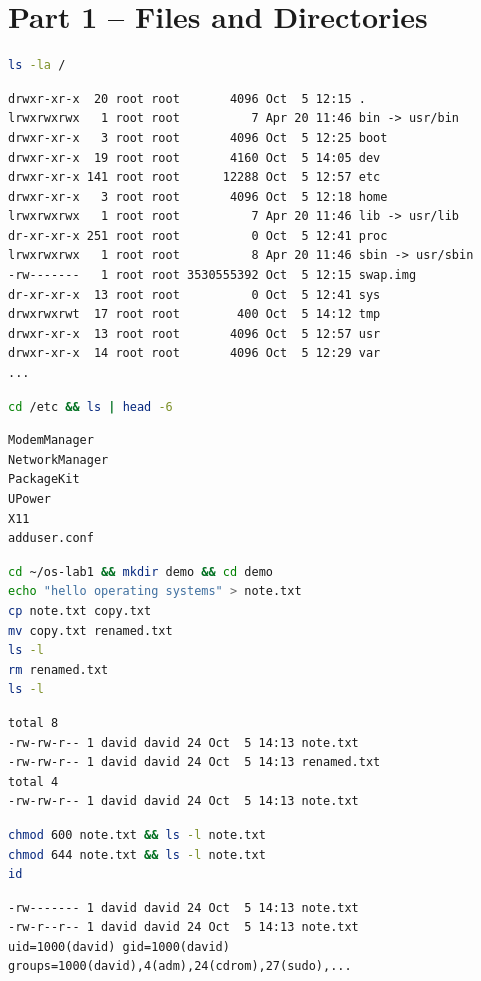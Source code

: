 \documentclass[12pt]{article}
\begin{document}
\section*{Part 1 -- Files and Directories}
\begin{lstlisting}[language=bash]
ls -la /
\end{lstlisting}
\begin{lstlisting}
drwxr-xr-x  20 root root       4096 Oct  5 12:15 .
lrwxrwxrwx   1 root root          7 Apr 20 11:46 bin -> usr/bin
drwxr-xr-x   3 root root       4096 Oct  5 12:25 boot
drwxr-xr-x  19 root root       4160 Oct  5 14:05 dev
drwxr-xr-x 141 root root      12288 Oct  5 12:57 etc
drwxr-xr-x   3 root root       4096 Oct  5 12:18 home
lrwxrwxrwx   1 root root          7 Apr 20 11:46 lib -> usr/lib
dr-xr-xr-x 251 root root          0 Oct  5 12:41 proc
lrwxrwxrwx   1 root root          8 Apr 20 11:46 sbin -> usr/sbin
-rw-------   1 root root 3530555392 Oct  5 12:15 swap.img
dr-xr-xr-x  13 root root          0 Oct  5 12:41 sys
drwxrwxrwt  17 root root        400 Oct  5 14:12 tmp
drwxr-xr-x  13 root root       4096 Oct  5 12:57 usr
drwxr-xr-x  14 root root       4096 Oct  5 12:29 var
...
\end{lstlisting}

\begin{lstlisting}[language=bash]
cd /etc && ls | head -6
\end{lstlisting}
\begin{lstlisting}
ModemManager
NetworkManager
PackageKit
UPower
X11
adduser.conf
\end{lstlisting}

\begin{lstlisting}[language=bash]
cd ~/os-lab1 && mkdir demo && cd demo
echo "hello operating systems" > note.txt
cp note.txt copy.txt
mv copy.txt renamed.txt
ls -l
rm renamed.txt
ls -l
\end{lstlisting}
\begin{lstlisting}
total 8
-rw-rw-r-- 1 david david 24 Oct  5 14:13 note.txt
-rw-rw-r-- 1 david david 24 Oct  5 14:13 renamed.txt
total 4
-rw-rw-r-- 1 david david 24 Oct  5 14:13 note.txt
\end{lstlisting}

\begin{lstlisting}[language=bash]
chmod 600 note.txt && ls -l note.txt
chmod 644 note.txt && ls -l note.txt
id
\end{lstlisting}
\begin{lstlisting}
-rw------- 1 david david 24 Oct  5 14:13 note.txt
-rw-r--r-- 1 david david 24 Oct  5 14:13 note.txt
uid=1000(david) gid=1000(david) groups=1000(david),4(adm),24(cdrom),27(sudo),...
\end{lstlisting}
\end{document}
